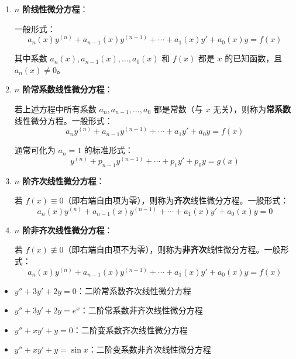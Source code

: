 \documentclass[../book.tex]{subfiles}
\begin{document}
    \begin{enumerate}
        \item \textbf{$n$ 阶线性微分方程}：

        一般形式：
        \[
            a_n(x)y^{(n)} + a_{n-1}(x)y^{(n-1)} + \cdots + a_1(x)y' + a_0(x)y = f(x)
        \]

        其中系数 $a_n(x), a_{n-1}(x), \ldots, a_0(x)$ 和 $f(x)$ 都是 $x$ 的已知函数，且 $a_n(x) \neq 0$。

        \item \textbf{$n$ 阶常系数线性微分方程}：

        若上述方程中所有系数 $a_n, a_{n-1}, \ldots, a_0$ 都是常数（与 $x$ 无关），则称为\textbf{常系数}线性微分方程。一般形式：
        \[
            a_ny^{(n)} + a_{n-1}y^{(n-1)} + \cdots + a_1y' + a_0y = f(x)
        \]

        通常可化为 $a_n = 1$ 的标准形式：
        \[
            y^{(n)} + p_{n-1}y^{(n-1)} + \cdots + p_1y' + p_0y = g(x)
        \]

        \item \textbf{$n$ 阶齐次线性微分方程}：

        若 $f(x) \equiv 0$（即右端自由项为零），则称为\textbf{齐次}线性微分方程。一般形式：
        \[
            a_n(x)y^{(n)} + a_{n-1}(x)y^{(n-1)} + \cdots + a_1(x)y' + a_0(x)y = 0
        \]

        \item \textbf{$n$ 阶非齐次线性微分方程}：

        若 $f(x) \not\equiv 0$（即右端自由项不为零），则称为\textbf{非齐次}线性微分方程。一般形式：
        \[
            a_n(x)y^{(n)} + a_{n-1}(x)y^{(n-1)} + \cdots + a_1(x)y' + a_0(x)y = f(x)
        \]
    \end{enumerate}

    \begin{analysisbox}[分类举例]
        \begin{itemize}
            \item $y'' + 3y' + 2y = 0$：二阶常系数齐次线性微分方程
            \item $y'' + 3y' + 2y = e^x$：二阶常系数非齐次线性微分方程
            \item $y'' + xy' + y = 0$：二阶变系数齐次线性微分方程
            \item $y'' + xy' + y = \sin x$：二阶变系数非齐次线性微分方程
        \end{itemize}
    \end{analysisbox}
\end{document}
